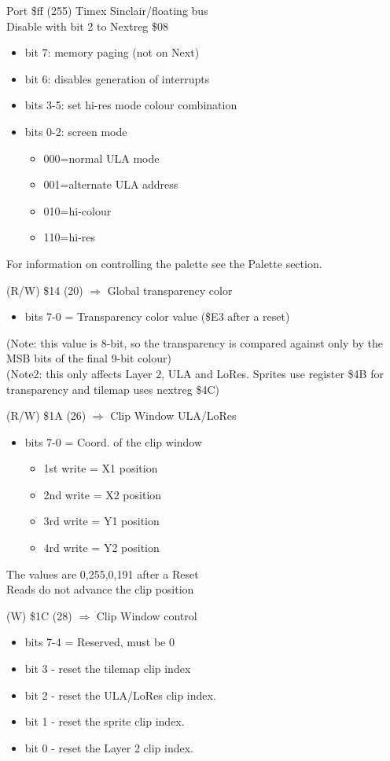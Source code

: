Port \$ff (255) Timex Sinclair/floating bus\\
Disable with bit 2 to Nextreg \$08
\begin{itemize}
\item[] bit 7: memory paging (not on Next)
\item[] bit 6: disables generation of interrupts
\item[] bits 3-5: set hi-res mode colour combination
\item[] bits 0-2: screen mode
  \begin{itemize}
  \item[] 000=normal ULA mode
  \item[] 001=alternate ULA address
  \item[] 010=hi-colour
  \item[] 110=hi-res
  \end{itemize}
\end{itemize}

For information on controlling the palette see the Palette section.

(R/W) \$14 (20) $\Rightarrow$ Global transparency color
\begin{itemize}
\item[] bits 7-0 = Transparency color value (\$E3 after a reset)
\end{itemize}
(Note: this value is 8-bit, so the transparency is compared against
only by the MSB bits of the final 9-bit colour)\\
(Note2: this only affects Layer 2, ULA and LoRes. Sprites use register
\$4B for transparency and tilemap uses nextreg \$4C)

(R/W) \$1A (26) $\Rightarrow$ Clip Window ULA/LoRes
\begin{itemize}
\item[] bits 7-0 = Coord. of the clip window
  \begin{itemize}
  \item[] 1st write = X1 position
  \item[] 2nd write = X2 position
  \item[] 3rd write = Y1 position
  \item[] 4rd write = Y2 position
  \end{itemize}
\end{itemize}
The values are 0,255,0,191 after a Reset\\
Reads do not advance the clip position

(W) \$1C (28) $\Rightarrow$ Clip Window control
\begin{itemize}
\item[] bits 7-4 = Reserved, must be 0
\item[] bit 3 - reset the tilemap clip index
\item[] bit 2 - reset the ULA/LoRes clip index.
\item[] bit 1 - reset the sprite clip index.
\item[] bit 0 - reset the Layer 2 clip index.
\end{itemize}


